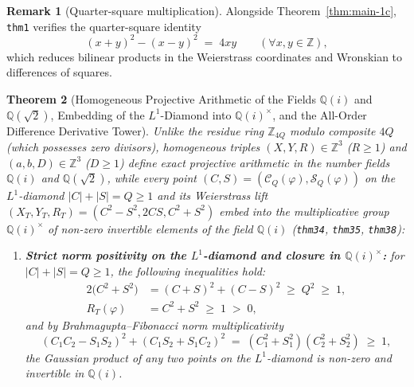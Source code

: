 \documentclass[11pt,a4paper]{article}
\theoremstyle{plain}
\newtheorem{theorem}{Theorem}[section]
\theoremstyle{definition}
\newtheorem{remark}[theorem]{Remark}
\begin{document}
\begin{remark}[Quarter-square multiplication]
\label{rem:quarter-square}
Alongside Theorem~\ref{thm:main-1c}, \texttt{thm1} verifies the quarter-square identity
\begin{equation}
  \label{eq:quarter-square-mul}
  (x + y)^2 - (x - y)^2 \;=\; 4xy \qquad (\forall x, y \in \mathbb{Z}),
\end{equation}
which reduces bilinear products in the Weierstrass coordinates and Wronskian to differences of squares.
\end{remark}

\begin{theorem}[Homogeneous Projective Arithmetic of the Fields $\mathbb{Q}(i)$ and $\mathbb{Q}(\sqrt{2})$, Embedding of the $L^1$-Diamond into $\mathbb{Q}(i)^\times$, and the All-Order Difference Derivative Tower]
\label{thm:main-34-field}
Unlike the residue ring $\mathbb{Z}_{4Q}$ modulo composite $4Q$ (which possesses zero divisors), homogeneous triples $(X, Y, R) \in \mathbb{Z}^3$ ($R \ge 1$) and $(a, b, D) \in \mathbb{Z}^3$ ($D \ge 1$) define exact projective arithmetic in the number fields $\mathbb{Q}(i)$ and $\mathbb{Q}(\sqrt{2})$, while every point $(C, S) = (\mathcal{C}_Q(\varphi), \mathcal{S}_Q(\varphi))$ on the $L^1$-diamond $|C| + |S| = Q \ge 1$ and its Weierstrass lift $(X_T, Y_T, R_T) = (C^2 - S^2, 2CS, C^2 + S^2)$ embed into the multiplicative group $\mathbb{Q}(i)^\times$ of non-zero invertible elements of the field $\mathbb{Q}(i)$ (\texttt{thm34}, \texttt{thm35}, \texttt{thm38}):
\begin{enumerate}[label=\textbf{(\roman*)},leftmargin=*]
\item \textbf{Strict norm positivity on the $L^1$-diamond and closure in $\mathbb{Q}(i)^\times$:}
  for $|C| + |S| = Q \ge 1$, the following inequalities hold:
  \begin{align}
    2\bigl(C^2 + S^2\bigr) &= (C + S)^2 + (C - S)^2 \;\ge\; Q^2 \;\ge\; 1, \label{eq:diamond-norm-positivity} \\
    R_T(\varphi) &= C^2 + S^2 \;\ge\; 1 \;>\; 0, \label{eq:weierstrass-denom-pos}
  \end{align}
  and by Brahmagupta--Fibonacci norm multiplicativity
  \begin{equation}
    \label{eq:brahmagupta-no-zero-divisors}
    (C_1 C_2 - S_1 S_2)^2 + (C_1 S_2 + S_1 C_2)^2 \;=\; (C_1^2 + S_1^2)(C_2^2 + S_2^2) \;\ge\; 1,
  \end{equation}
  the Gaussian product of any two points on the $L^1$-diamond is non-zero and invertible in $\mathbb{Q}(i)$.


\end{enumerate}
\end{theorem}
\end{document}
